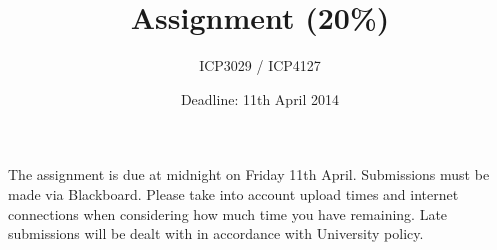 \documentclass[11pt,oneside,a4paper,final]{article}
\title{Assignment (20\%)}
\author{ICP3029 / ICP4127}
\date{Deadline: 11th April 2014}                                           %
\begin{document}
\maketitle

\sloppy

The assignment is due at midnight on Friday 11th April. 
Submissions must be made via Blackboard. 
Please take into account upload times and internet connections when considering how much time you have remaining. 
Late submissions will be dealt with in accordance with University policy. \\

\end{document}
